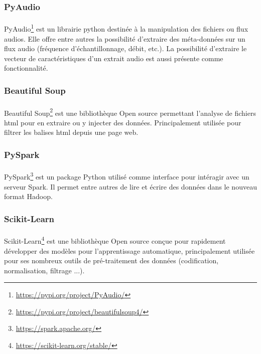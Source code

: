 		\subsubsection*{PyAudio}
		\paragraph{}
		PyAudio\footnote{\url{https://pypi.org/project/PyAudio/}} est un librairie python destinée à la manipulation des fichiers ou flux audios. Elle offre entre autres la possibilité d'extraire des méta-données sur un flux audio (fréquence d'échantillonnage, débit, etc.). La possibilité d'extraire le vecteur de caractéristiques d'un extrait audio est aussi présente comme fonctionnalité.
		
		\subsubsection*{Beautiful Soup}
		\paragraph{}
		Beautiful Soup\footnote{\url{https://pypi.org/project/beautifulsoup4/}} est une bibliothèque Open source permettant l'analyse de fichiers html pour en extraire ou y injecter des données. Principalement utilisée pour filtrer les balises html depuis une page web.
		
		\subsubsection*{PySpark}
		\paragraph{}
		PySpark\footnote{\url{https://spark.apache.org/}} est un package Python utilisé comme interface pour intéragir avec un serveur Spark. Il permet entre autres de lire et écrire des données dans le nouveau format Hadoop.
		
		\subsubsection*{Scikit-Learn}
		\paragraph{}
		Scikit-Learn\footnote{\url{https://scikit-learn.org/stable/}} est une bibliothèque Open source conçue pour rapidement développer des modèles pour l'apprentissage automatique, principalement utilisée pour ses nombreux outils de pré-traitement des données (codification, normalisation, filtrage ...).
		
